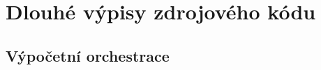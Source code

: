 \chapter{Dlouhé výpisy zdrojového kódu}
\label{sec:Appendix1}

\section{Výpočetní orchestrace}
\label{sec:appendix_long_listings}





\endinput